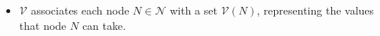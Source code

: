\documentclass{article}
\newcommand{\V}{\mathcal V}
\newcommand{\MN}{PDG}
\numberwithin{equation}{section}
\begin{document}
\begin{notfocus}
\begin{defn}[\MN]
\begin{itemize}[nosep]
\item $\V$ associates each node $N \in
                          \mathcal N$ with a set $\V(N)$,
                          representing the values that node $N$ can
                          take. 

\end{itemize}
\end{defn}
\end{notfocus}
\end{document}

